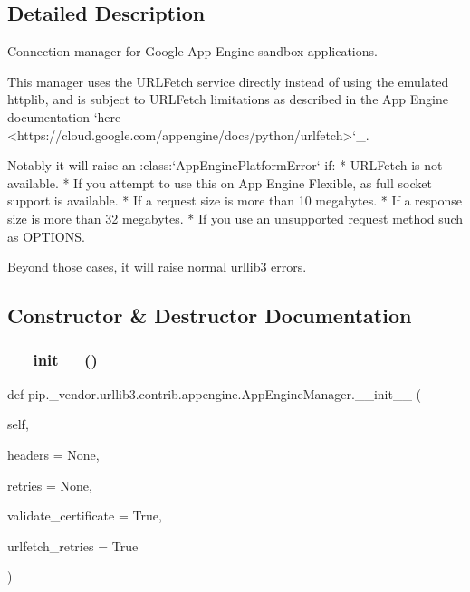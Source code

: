 \subsection{Detailed Description}
\begin{DoxyVerb}Connection manager for Google App Engine sandbox applications.

This manager uses the URLFetch service directly instead of using the
emulated httplib, and is subject to URLFetch limitations as described in
the App Engine documentation `here
<https://cloud.google.com/appengine/docs/python/urlfetch>`_.

Notably it will raise an :class:`AppEnginePlatformError` if:
    * URLFetch is not available.
    * If you attempt to use this on App Engine Flexible, as full socket
      support is available.
    * If a request size is more than 10 megabytes.
    * If a response size is more than 32 megabytes.
    * If you use an unsupported request method such as OPTIONS.

Beyond those cases, it will raise normal urllib3 errors.
\end{DoxyVerb}
 

\subsection{Constructor \& Destructor Documentation}
\mbox{\label{classpip_1_1__vendor_1_1urllib3_1_1contrib_1_1appengine_1_1AppEngineManager_a326752207b6e6a55e0227e4e3bbe410a}} 
\subsubsection{\texorpdfstring{\+\_\+\+\_\+init\+\_\+\+\_\+()}{\_\_init\_\_()}}
{\footnotesize\ttfamily def pip.\+\_\+vendor.\+urllib3.\+contrib.\+appengine.\+App\+Engine\+Manager.\+\_\+\+\_\+init\+\_\+\+\_\+ (\begin{DoxyParamCaption}\item[{}]{self,  }\item[{}]{headers = {\ttfamily None},  }\item[{}]{retries = {\ttfamily None},  }\item[{}]{validate\+\_\+certificate = {\ttfamily True},  }\item[{}]{urlfetch\+\_\+retries = {\ttfamily True} }\end{DoxyParamCaption})}



